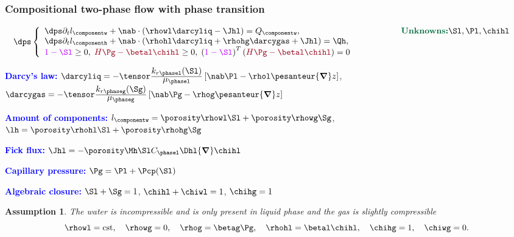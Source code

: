 \documentclass[10 pt]{beamer}
\newtheorem{assumption}[theorem]{Assumption}
\begin{document}
\subsection{}  

\begin{frame}
\frametitle{Compositional two-phase flow with phase transition}
\vspace{-0.8 cm}
\begin{equation*}
\hspace{-0.2 cm}
\dps
\left\lbrace\begin{array}{llccc}
\dps \partial_t l_\componentw + \nab \cdot (\rhowl \darcyliq-\Jhl) = Q_{\componentw}, \hspace{4 cm} \mbox{\textcolor{cadmiumgreen}{\textbf{ Unknowns:}}} \Sl, \Pl, \chihl \\
              \dps \partial_t l_\componenth  + \nab \cdot (\rhohl \darcyliq  + \rhohg \darcygas+\Jhl)=\Qh,\\
\textcolor{electricpurple}{1-\Sl} \geq 0, \;  \textcolor{carmine}{H \Pg-\betal \chihl} \geq 0, \; \left(\textcolor{electricpurple}{1-\Sl} \right)^T \left(\textcolor{carmine}{H \Pg-\betal \chihl}\right)=0  
\end{array}
\right.
\end{equation*}

\textcolor{blue}{\textbf{Darcy's law:}} $\darcyliq = -\tensor \frac{\displaystyle k_{r \phasel}(\Sl)}{ \displaystyle \mu_{\phasel}} \left[\nab \Pl- \rhol \pesanteur {\bm\nabla} z\right]$, $\darcygas = -\tensor \frac{\displaystyle k_{r \phaseg}(\Sg)}{ \displaystyle \mu_{\phaseg}} \left[\nab \Pg -\rhog \pesanteur {\bm\nabla} z\right]$
\vspace{0.02\textwidth}

\textcolor{blue}{\textbf{Amount of components:}}
$l_\componentw = \porosity \rhowl \Sl + \porosity \rhowg \Sg$, 
\quad $\lh = \porosity \rhohl \Sl+\porosity \rhohg \Sg$
\vspace{0.02\textwidth}

\textcolor{blue}{\textbf{Fick flux:}} $\Jhl = -\porosity \Mh \Sl C_{\phasel} \Dhl {\bm \nabla} \chihl$
\vspace{0.02\textwidth}

\textcolor{blue}{\textbf{Capillary pressure:}} $\Pg = \Pl + \Pcp(\Sl)$

\vspace{0.02\textwidth}

\textcolor{blue}{\textbf{Algebraic closure:}} $\Sl + \Sg = 1$, \quad $\chihl + \chiwl = 1$, \quad $\chihg = 1$
\begin{assumption}
The water is incompressible and is only present in liquid phase and the gas is slightly compressible
\begin{equation*}
\rhowl = \mathrm{cst}, \quad \rhowg = 0, \quad \rhog = \betag \Pg, \quad \rhohl = \betal \chihl, \quad \chihg = 1, \quad \chiwg=0.
\end{equation*}
\end{assumption}
\end{frame}
\end{document}
